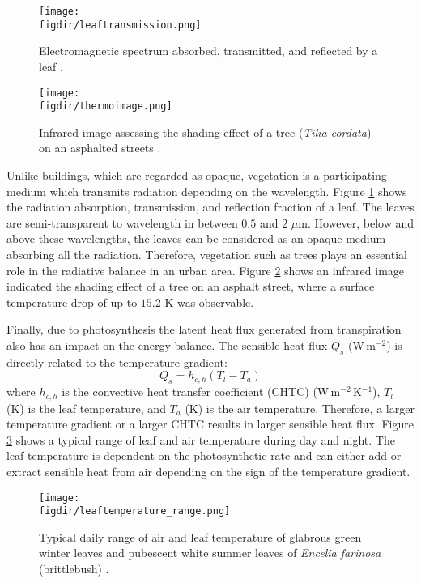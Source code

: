 \begin{figure}[p]
	\centering
	\texttt{[image: \\figdir/leaftransmission.png]}
	\caption{Electromagnetic spectrum absorbed, transmitted, and reflected by a leaf \citep{Lambers2008,nobel2009physicochemical}. }
	\label{fig:leaftransmission}
\end{figure}

\begin{figure}[p]
	\centering
	\texttt{[image: \\figdir/thermoimage.png]}
	\caption{Infrared image assessing the shading effect of a tree (\textit{Tilia cordata}) on an asphalted streets \citep{Gillner2015}. }
	\label{fig:thermoimage}
\end{figure}	

Unlike buildings, which are regarded as opaque, vegetation is a participating medium which transmits radiation depending on the wavelength. Figure \ref{fig:leaftransmission} shows the radiation absorption, transmission, and reflection fraction of a leaf. The leaves are semi-transparent to wavelength in between $0.5$ and $2$ $\mu$m. However, below and above these wavelengths, the leaves can be considered as an opaque medium absorbing all the radiation. Therefore, vegetation such as trees plays an essential role in the radiative balance in an urban area. Figure \ref{fig:thermoimage} shows an infrared image indicated the shading effect of a tree on an asphalt street, where a surface temperature drop of up to $15.2$ K was observable.

Finally, due to photosynthesis the latent heat flux generated from transpiration also has an impact on the energy balance. The sensible heat flux $Q_s$ (W\,m$^{-2}$) is directly related to the temperature gradient:
\begin{equation}
Q_s = h_{c,h} \left(T_l - T_a\right)
\end{equation}
where $h_{c,h}$ is the convective heat transfer coefficient (CHTC) (W\,m$^{-2}$\,K$^{-1}$), $T_l$ (K) is the leaf temperature, and $T_a$ (K) is the air temperature. Therefore, a larger temperature gradient or a larger CHTC results in larger sensible heat flux. Figure \ref{fig:leaftemperature_range} shows a typical range of leaf and air temperature during day and night. The leaf temperature is dependent on the photosynthetic rate and can either add or extract sensible heat from air depending on the sign of the temperature gradient.

\begin{figure}[p]
	\centering
	\texttt{[image: \\figdir/leaftemperature\_range.png]}
	\caption{Typical daily range of air and leaf temperature of glabrous green winter leaves and pubescent white summer leaves of \textit{Encelia farinosa} (brittlebush) \citep{Lambers2008}. }
	\label{fig:leaftemperature_range}
\end{figure}

